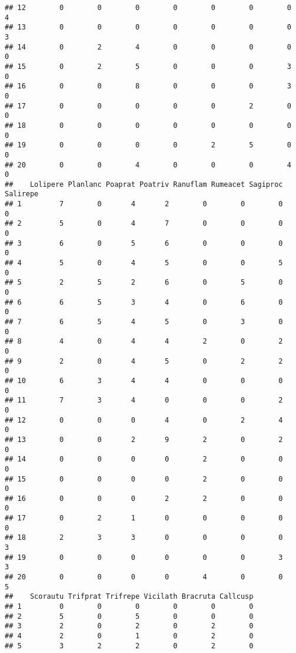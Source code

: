 \documentclass[
]{book}
\begin{document}
\begin{verbatim}
## 12        0        0        0        0        0        0        0        4
## 13        0        0        0        0        0        0        0        3
## 14        0        2        4        0        0        0        0        0
## 15        0        2        5        0        0        0        3        0
## 16        0        0        8        0        0        0        3        0
## 17        0        0        0        0        0        2        0        0
## 18        0        0        0        0        0        0        0        0
## 19        0        0        0        0        2        5        0        0
## 20        0        0        4        0        0        0        4        0
##    Lolipere Planlanc Poaprat Poatriv Ranuflam Rumeacet Sagiproc Salirepe
## 1         7        0       4       2        0        0        0        0
## 2         5        0       4       7        0        0        0        0
## 3         6        0       5       6        0        0        0        0
## 4         5        0       4       5        0        0        5        0
## 5         2        5       2       6        0        5        0        0
## 6         6        5       3       4        0        6        0        0
## 7         6        5       4       5        0        3        0        0
## 8         4        0       4       4        2        0        2        0
## 9         2        0       4       5        0        2        2        0
## 10        6        3       4       4        0        0        0        0
## 11        7        3       4       0        0        0        2        0
## 12        0        0       0       4        0        2        4        0
## 13        0        0       2       9        2        0        2        0
## 14        0        0       0       0        2        0        0        0
## 15        0        0       0       0        2        0        0        0
## 16        0        0       0       2        2        0        0        0
## 17        0        2       1       0        0        0        0        0
## 18        2        3       3       0        0        0        0        3
## 19        0        0       0       0        0        0        3        3
## 20        0        0       0       0        4        0        0        5
##    Scorautu Trifprat Trifrepe Vicilath Bracruta Callcusp
## 1         0        0        0        0        0        0
## 2         5        0        5        0        0        0
## 3         2        0        2        0        2        0
## 4         2        0        1        0        2        0
## 5         3        2        2        0        2        0

\end{verbatim}
\end{document}
